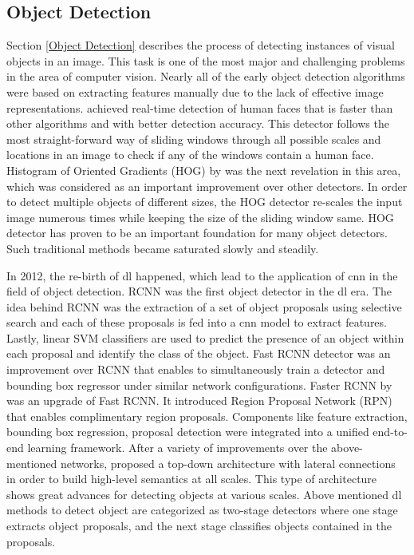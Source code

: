 \subsection{Object Detection}

Section \ref{Object Detection} describes the process of detecting instances of visual objects in an image. This task is one of the most major and challenging problems in the area of computer vision. Nearly all of the early object detection algorithms were based on extracting features manually due to the lack of effective image representations. \cite{viola2001rapid} achieved real-time detection of human faces that is faster than other algorithms and with better detection accuracy. This detector follows the most straight-forward way of sliding windows through all possible scales and locations in an image to check if any of the windows contain a human face. Histogram of Oriented Gradients (HOG) by \cite{dalal2005histograms} was the next revelation in this area, which was considered as an important improvement over other detectors. In order to detect multiple objects of different sizes, the HOG detector re-scales the input image numerous times while keeping the size of the sliding window same. HOG detector has proven to be an important foundation for many object detectors. Such traditional methods became saturated slowly and steadily. 
\par
In 2012, the re-birth of \ac{dl} happened, which lead to the application of \ac{cnn} in the field of object detection. RCNN \cite{DBLP:journals/corr/GuptaGAM14} was the first object detector in the \ac{dl} era. The idea behind RCNN was the extraction of a set of object proposals using selective search \cite{van2011segmentation} and each of these proposals is fed into a \ac{cnn} model to extract features. Lastly, linear SVM classifiers are used to predict the presence of an object within each proposal and identify the class of the object. Fast RCNN \cite{girshick2015fast} detector was an improvement over RCNN that enables to simultaneously train a detector and bounding box regressor under similar network configurations. Faster RCNN by \cite{DBLP:journals/corr/RenHG015} was an upgrade of Fast RCNN. It introduced Region Proposal Network (RPN) that enables complimentary region proposals. Components like feature extraction, bounding box regression, proposal detection were integrated into a unified end-to-end learning framework. After a variety of improvements over the above-mentioned networks, \cite{lin2017feature} proposed a top-down architecture with lateral connections in order to build high-level semantics at all scales. This type of architecture shows great advances for detecting objects at various scales. Above mentioned \ac{dl} methods to detect object are categorized as two-stage detectors where one stage extracts object proposals, and the next stage classifies objects contained in the proposals.  
